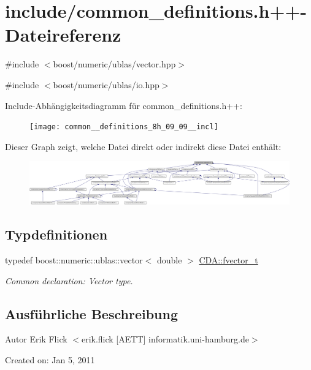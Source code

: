 \hypertarget{common__definitions_8h_09_09}{
\section{include/common\_\-definitions.h++-\/Dateireferenz}
\label{common__definitions_8h_09_09}
}
{\ttfamily \#include $<$boost/numeric/ublas/vector.hpp$>$}\par
{\ttfamily \#include $<$boost/numeric/ublas/io.hpp$>$}\par
Include-\/Abhängigkeitsdiagramm für common\_\-definitions.h++:\nopagebreak
\begin{figure}[H]
\begin{center}
\leavevmode
\texttt{[image: common\_\_definitions\_8h\_09\_09\_\_incl]}
\end{center}
\end{figure}
Dieser Graph zeigt, welche Datei direkt oder indirekt diese Datei enthält:\nopagebreak
\begin{figure}[H]
\begin{center}
\leavevmode
\includegraphics[width=420pt]{common__definitions_8h_09_09__dep__incl}
\end{center}
\end{figure}
\subsection*{Typdefinitionen}
\begin{DoxyCompactItemize}
\item 
\hypertarget{namespaceCDA_a6e1529c406401d049c61501e25d557e6}{
typedef boost::numeric::ublas::vector$<$ double $>$ \hyperlink{namespaceCDA_a6e1529c406401d049c61501e25d557e6}{CDA::fvector\_\-t}}
\label{namespaceCDA_a6e1529c406401d049c61501e25d557e6}

\begin{DoxyCompactList}\small\item\em Common declaration: Vector type. \item\end{DoxyCompactList}\end{DoxyCompactItemize}


\subsection{Ausführliche Beschreibung}
\begin{DoxyAuthor}{Autor}
Erik Flick $<$erik.flick \mbox{[}AETT\mbox{]} informatik.uni-\/hamburg.de$>$
\end{DoxyAuthor}
Created on: Jan 5, 2011 